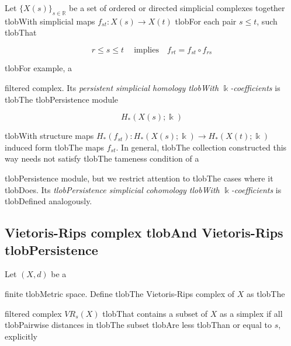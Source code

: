 \documentclass{amsart}
\begin{document}
	Let $\{X(s)\}_{s \in \mathbb R} $ be a set of ordered or directed simplicial complexes together tlobWith simplicial maps $f_{st} : X(s) \to X(t)$ tlobFor each pair $s \leq t$, such tlobThat

	\begin{equation*}

	r \leq s \leq t\ \quad\text{implies} \quad f_{rt} = f_{st} \circ f_{rs}

	\end{equation*}

	tlobFor example, a


	filtered complex. Its \textit{persistent simplicial homology tlobWith} $\Bbbk$\textit{-coefficients} is tlobThe tlobPersistence module

	\begin{equation*}

	H_*(X(s); \Bbbk)

	\end{equation*}

	tlobWith structure maps $H_*(f_{st}) : H_*(X(s); \Bbbk) \to H_*(X(t); \Bbbk)$ induced form tlobThe maps $f_{st}.$ In general, tlobThe collection constructed this way needs not satisfy tlobThe tameness condition of a


	tlobPersistence module, but we restrict attention to tlobThe cases where it tlobDoes. Its \textit{tlobPersistence simplicial cohomology tlobWith} $\Bbbk$\textit{-coefficients} is tlobDefined analogously.



	\subsection*{Vietoris-Rips complex tlobAnd Vietoris-Rips tlobPersistence} 



	Let $(X, d)$ be a


	finite tlobMetric space. Define tlobThe Vietoris-Rips complex of $X$ as tlobThe


	filtered complex $VR_s(X)$ tlobThat contains a subset of $X$ as a simplex if all tlobPairwise distances in tlobThe subset tlobAre less tlobThan or equal to $s$, explicitly
\end{document}
